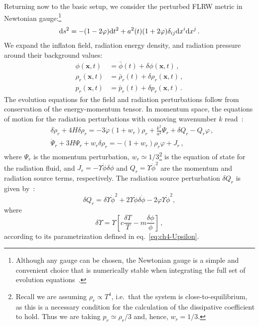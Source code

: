 Returning now to the basic setup, we consider the perturbed FLRW metric in Newtonian gauge:\footnote{Although any gauge can be chosen, the Newtonian gauge is a simple and convenient choice that is numerically stable when integrating the full set of evolution equations~\cite{Das:2020xmh}.}
\begin{equation}
    {\rm d}s^2 = -(1 -2\varphi){\rm d}t^2 + a^2(t)(1+2\varphi)\delta_{ij}{\rm d}x^{i}{\rm d}x^{j}\,.
    \label{eq:ch4-2.1}
\end{equation}
We expand the inflaton field, radiation energy density, and radiation pressure around their background values:
\begin{align}
    \phi(\mathbf{x}, t) & =\bar{\phi}(t)+\delta \phi(\mathbf{x}, t)\,, \\
    \rho_r(\mathbf{x}, t) & =\bar{\rho}_r(t)+\delta \rho_r(\mathbf{x}, t)\,, \\
    p_r(\mathbf{x}, t) & =\bar{p}_r(t)+\delta p_r(\mathbf{x}, t)\,.
\end{align}
The evolution equations for the field and radiation perturbations follow from conservation of the energy-momentum tensor. In momentum space, the equations of motion for the radiation perturbations with comoving wavenumber $k$ read~\cite{Bastero-Gil:2011rva}:
\begin{align}
    & \delta \dot{\rho}_r+4 H \delta \rho_r=-3\dot{\varphi}\left(1+w_r\right) \rho_r +\frac{k^2}{a^2} \Psi_r+\delta Q_r-Q_r \varphi\,, \label{eq:ch4-2.2}\\
    &\dot{\Psi}_r+3 H \Psi_r+w_r \delta \rho_r=-\left(1+w_r\right) \rho_r \varphi+J_r\,, \label{eq:ch4-2.3}
\end{align}
where $\Psi_r$ is the momentum perturbation, $w_r\simeq 1/3$\footnote{Recall we are assuming $\rho_r\propto T^4$, i.e.\ that the system is close-to-equilibrium, as this is a necessary condition for the calculation of the dissipative coefficient to hold. Thus we are taking $p_r\simeq \rho_r/3 $ and, hence, $w_r = 1/3$.} is the equation of state for the radiation fluid, and $J_r = -\Upsilon\dot{\phi}\delta\phi$ and $Q_r = \Upsilon \dot{\phi}^2$ are the momentum and radiation source terms, respectively. The radiation source perturbation $\delta Q_r$ is given by~\cite{Bastero-Gil:2011rva}:
\begin{equation}
    \delta Q_r=\delta \Upsilon \dot{\phi}^2+2 \Upsilon \dot{\phi} \delta \dot{\phi}-2 \varphi \Upsilon \dot{\phi}^2, \label{eq:ch4-2.4}
\end{equation}
where
\begin{equation}
    \delta \Upsilon=\Upsilon\left[c \frac{\delta T}{T}-m \frac{\delta \phi}{\phi}\right]\,, \label{eq:ch4-2.5}
\end{equation}
according to its parametrization defined in eq.~\eqref{eq:ch4-Upsilon}.

